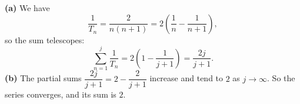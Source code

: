\textbf{(a)} We have
\[\dfrac{1}{T_n}=\dfrac{2}{n(n+1)}=2\left(\dfrac{1}{n}-\dfrac{1}{n+1}\right),\]
so the sum telescopes:
\[\sum_{n=1}^{j}\dfrac{1}{T_n}=2\left(1-\dfrac{1}{j+1}\right)=\boxed{\dfrac{2j}{j+1}}.\]
\textbf{(b)} The partial sums $\dfrac{2j}{j+1}=2-\dfrac{2}{j+1}$ increase and tend to $2$ as $j\to\infty$. So the series converges, and its sum is $\boxed{2}$.

